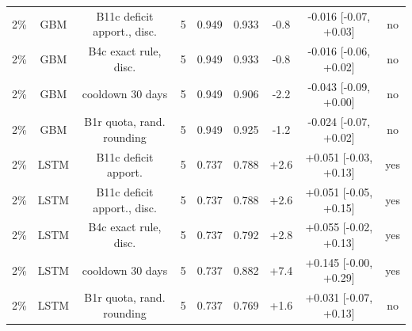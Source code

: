 \documentclass[10pt,onecolumn,letterpaper]{article}
\begin{document}
\begin{table}[!t]
{\begin{tabular}{lcccccccc}
2\% & GBM & B11c deficit apport., disc. & 5 & 0.949 & 0.933 & -0.8 & -0.016 [-0.07, +0.03] & no \\
2\% & GBM & B4c exact rule, disc. & 5 & 0.949 & 0.933 & -0.8 & -0.016 [-0.06, +0.02] & no \\
2\% & GBM & cooldown 30 days & 5 & 0.949 & 0.906 & -2.2 & -0.043 [-0.09, +0.00] & no \\
2\% & GBM & B1r quota, rand. rounding & 5 & 0.949 & 0.925 & -1.2 & -0.024 [-0.07, +0.02] & no \\
2\% & LSTM & B11c deficit apport. & 5 & 0.737 & 0.788 & +2.6 & +0.051 [-0.03, +0.13] & yes \\
2\% & LSTM & B11c deficit apport., disc. & 5 & 0.737 & 0.788 & +2.6 & +0.051 [-0.05, +0.15] & yes \\
2\% & LSTM & B4c exact rule, disc. & 5 & 0.737 & 0.792 & +2.8 & +0.055 [-0.02, +0.13] & yes \\
2\% & LSTM & cooldown 30 days & 5 & 0.737 & 0.882 & +7.4 & +0.145 [-0.00, +0.29] & yes \\
2\% & LSTM & B1r quota, rand. rounding & 5 & 0.737 & 0.769 & +1.6 & +0.031 [-0.07, +0.13] & no \\
\bottomrule
\end{tabular}}
\end{table}
\end{document}
